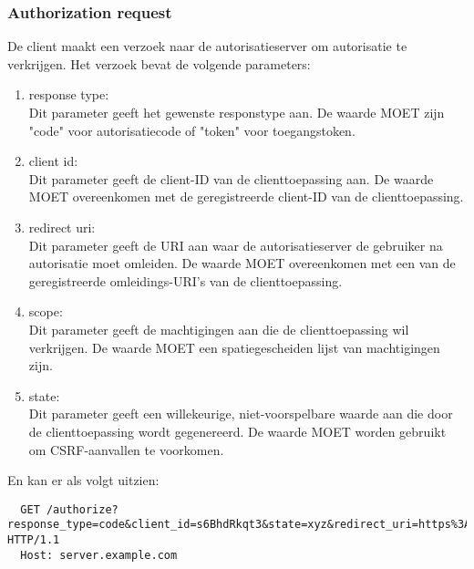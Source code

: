 \subsubsection{Authorization request}%
\label{subsubsec:authorization-request}
De client maakt een verzoek naar de autorisatieserver om autorisatie te verkrijgen. Het verzoek bevat de volgende parameters:
\begin{enumerate}[label=\textbf{-}]
    \item response type: \\
    Dit parameter geeft het gewenste responstype aan. De waarde MOET zijn "code" voor autorisatiecode of "token" voor toegangstoken.
  
    \item client id: \\
    Dit parameter geeft de client-ID van de clienttoepassing aan. De waarde MOET overeenkomen met de geregistreerde client-ID van de clienttoepassing.
  
    \item redirect uri: \\
    Dit parameter geeft de URI aan waar de autorisatieserver de gebruiker na autorisatie moet omleiden. De waarde MOET overeenkomen met een van de geregistreerde omleidings-URI's van de clienttoepassing.
  
    \item scope: \\
    Dit parameter geeft de machtigingen aan die de clienttoepassing wil verkrijgen. De waarde MOET een spatiegescheiden lijst van machtigingen zijn.
  
    \item state: \\
    Dit parameter geeft een willekeurige, niet-voorspelbare waarde aan die door de clienttoepassing wordt gegenereerd. De waarde MOET worden gebruikt om CSRF-aanvallen te voorkomen.
  \end{enumerate}
  En kan er als volgt uitzien:
  \begin{verbatim}
  GET /authorize?response_type=code&client_id=s6BhdRkqt3&state=xyz&redirect_uri=https%3A%2F%2Fclient%2Eexample%2Ecom%2Fcb HTTP/1.1
  Host: server.example.com
  \end{verbatim}

